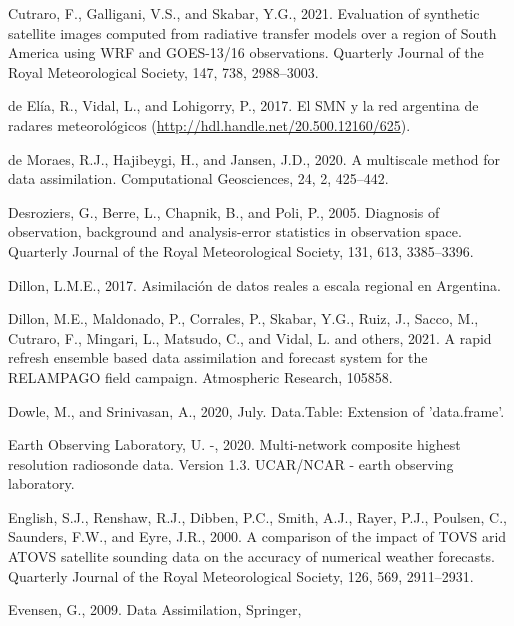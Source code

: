 \documentclass[12pt,oneside,a4paper]{reedthesis}
\begin{document}
\leavevmode\hypertarget{ref-cutraro2021}{}%
Cutraro, F., Galligani, V.S., and Skabar, Y.G., 2021. Evaluation of synthetic satellite images computed from radiative transfer models over a region of South America using WRF and GOES-13/16 observations. Quarterly Journal of the Royal Meteorological Society, 147, 738, 2988--3003.

\leavevmode\hypertarget{ref-deelia2017}{}%
de Elía, R., Vidal, L., and Lohigorry, P., 2017. El SMN y la red argentina de radares meteorológicos (\url{http://hdl.handle.net/20.500.12160/625}).

\leavevmode\hypertarget{ref-demoraes2020}{}%
de Moraes, R.J., Hajibeygi, H., and Jansen, J.D., 2020. A multiscale method for data assimilation. Computational Geosciences, 24, 2, 425--442.

\leavevmode\hypertarget{ref-desroziers2005}{}%
Desroziers, G., Berre, L., Chapnik, B., and Poli, P., 2005. Diagnosis of observation, background and analysis-error statistics in observation space. Quarterly Journal of the Royal Meteorological Society, 131, 613, 3385--3396.

\leavevmode\hypertarget{ref-dillon2017}{}%
Dillon, L.M.E., 2017. Asimilación de datos reales a escala regional en Argentina.

\leavevmode\hypertarget{ref-dillon2021}{}%
Dillon, M.E., Maldonado, P., Corrales, P., Skabar, Y.G., Ruiz, J., Sacco, M., Cutraro, F., Mingari, L., Matsudo, C., and Vidal, L. and others, 2021. A rapid refresh ensemble based data assimilation and forecast system for the RELAMPAGO field campaign. Atmospheric Research, 105858.

\leavevmode\hypertarget{ref-dowle2020}{}%
Dowle, M., and Srinivasan, A., 2020, July. Data.Table: Extension of 'data.frame'.

\leavevmode\hypertarget{ref-sondeos}{}%
Earth Observing Laboratory, U. -, 2020. Multi-network composite highest resolution radiosonde data. Version 1.3. UCAR/NCAR - earth observing laboratory.

\leavevmode\hypertarget{ref-english2000}{}%
English, S.J., Renshaw, R.J., Dibben, P.C., Smith, A.J., Rayer, P.J., Poulsen, C., Saunders, F.W., and Eyre, J.R., 2000. A comparison of the impact of TOVS arid ATOVS satellite sounding data on the accuracy of numerical weather forecasts. Quarterly Journal of the Royal Meteorological Society, 126, 569, 2911--2931.

\leavevmode\hypertarget{ref-evensen2009}{}%
Evensen, G., 2009. Data Assimilation, Springer,
\end{document}

